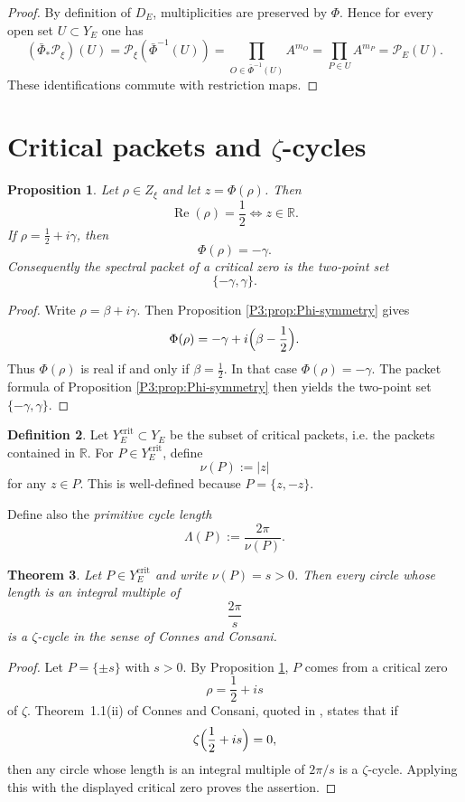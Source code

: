 \documentclass[11pt,a4paper]{article}
\numberwithin{equation}{section}
\newtheorem{theorem}{Theorem}[section]
\newtheorem{proposition}[theorem]{Proposition}
\theoremstyle{definition}
\newtheorem{definition}[theorem]{Definition}
\theoremstyle{remark}
\DeclareMathOperator{\Rea}{Re}
\newcommand{\RR}{\mathbb R}
\newcommand{\cP}{\mathcal P}
\begin{document}
\begin{proof}
By definition of $D_E$, multiplicities are preserved by $\Phi$.  Hence for every open set $U\subset Y_E$ one has
\[
(\bar\Phi_*\cP_\xi)(U)=\cP_\xi(\bar\Phi^{-1}(U))
=\prod_{O\in \bar\Phi^{-1}(U)} A^{m_O}
=\prod_{P\in U} A^{m_P}
=\cP_E(U).
\]
These identifications commute with restriction maps.
\end{proof}

\section{Critical packets and $\zeta$-cycles}

\begin{proposition}\label{P3:prop:critical-real}
Let $\rho\in Z_\xi$ and let $z=\Phi(\rho)$.  Then
\[
\Rea(\rho)=\frac12
\iff
z\in\RR.
\]
If $\rho=\frac12+i\gamma$, then
\[
\Phi(\rho)=-\gamma.
\]
Consequently the spectral packet of a critical zero is the two-point set
\[
\{-\gamma,\gamma\}.
\]
\end{proposition}

\begin{proof}
Write $\rho=\beta+i\gamma$.  Then Proposition \ref{P3:prop:Phi-symmetry} gives
\[
\Phi(\rho)=-\gamma+i\Bigl(\beta-\frac12\Bigr).
\]
Thus $\Phi(\rho)$ is real if and only if $\beta=\frac12$.  In that case $\Phi(\rho)=-\gamma$.  The packet formula of Proposition \ref{P3:prop:Phi-symmetry} then yields the two-point set $\{-\gamma,\gamma\}$.
\end{proof}

\begin{definition}
Let $Y_E^{\mathrm{crit}}\subset Y_E$ be the subset of critical packets, i.e. the packets contained in $\RR$.  For $P\in Y_E^{\mathrm{crit}}$, define
\[
\nu(P):=|z|
\]
for any $z\in P$.  This is well-defined because $P=\{z,-z\}$.

Define also the \emph{primitive cycle length}
\[
\Lambda(P):=\frac{2\pi}{\nu(P)}.
\]
\end{definition}

\begin{theorem}\label{P3:thm:zeta-cycles}
Let $P\in Y_E^{\mathrm{crit}}$ and write $\nu(P)=s>0$.  Then every circle whose length is an integral multiple of
\[
\frac{2\pi}{s}
\]
is a $\zeta$-cycle in the sense of Connes and Consani.
\end{theorem}

\begin{proof}
Let $P=\{\pm s\}$ with $s>0$.  By Proposition \ref{P3:prop:critical-real}, $P$ comes from a critical zero
\[
\rho=\frac12+is
\]
of $\zeta$.  Theorem~1.1(ii) of Connes and Consani, quoted in \cite{ConnesConsaniCycles}, states that if
\[
\zeta\Bigl(\frac12+is\Bigr)=0,
\]
then any circle whose length is an integral multiple of $2\pi/s$ is a $\zeta$-cycle.  Applying this with the displayed critical zero proves the assertion.
\end{proof}
\end{document}
